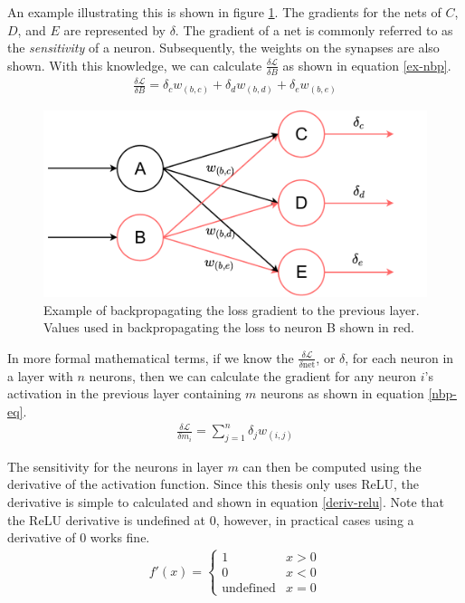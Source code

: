 An example illustrating this is shown in figure \ref{neuron-bp}. The gradients for the nets of $C$, $D$, and $E$ are represented by $\delta$. The gradient of a net is commonly referred to as the \textit{sensitivity} of a neuron. Subsequently, the weights on the synapses are also shown. With this knowledge, we can calculate $\frac{\delta \mathcal{L}}{\delta B}$ as shown in equation \ref{ex-nbp}.
\begin{align}
\frac{\delta \mathcal{L}}{\delta B} = \delta_cw_{(b,c)} + \delta_dw_{(b,d)} + \delta_ew_{(b,e)} \label{ex-nbp}
\end{align}
\begin{figure}
	\centering 
	\includegraphics[width=\textwidth]{figures/neuron_bp.pdf}
	\caption{Example of backpropagating the loss gradient to the previous layer. Values used in backpropagating the loss to neuron B shown in red.} \label{neuron-bp}
\end{figure}

In more formal mathematical terms, if we know the $\frac{\delta \mathcal{L}}{\delta \text{net}}$, or $\delta$, for each neuron in a layer with $n$ neurons, then we can calculate the gradient for any neuron $i$'s activation in the previous layer containing $m$ neurons as shown in equation \ref{nbp-eq}.
\begin{align}
\frac{\delta \mathcal{L}}{\delta m_i} = \sum_{j=1}^{n} \delta_jw_{(i,j)} \label{nbp-eq}
\end{align}

The sensitivity for the neurons in layer $m$ can then be computed using the derivative of the activation function. Since this thesis only uses ReLU, the derivative is simple to calculated and shown in equation \ref{deriv-relu}. Note that the ReLU derivative is undefined at 0, however, in practical cases using a derivative of 0 works fine.
\begin{align}
f'(x) = \begin{cases}
	1 & x > 0\\
	0 & x < 0\\
	\text{undefined} & x = 0
\end{cases}\label{deriv-relu}
\end{align}


